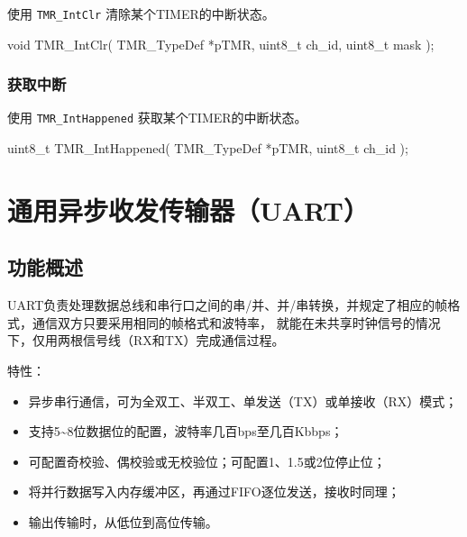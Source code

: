 \documentclass[
  12pt,
]{book}
\newenvironment{Shaded}{\begin{snugshade}}{\end{snugshade}}
\newcommand{\DataTypeTok}[1]{\textcolor[rgb]{0.13,0.29,0.53}{#1}}
\newcommand{\NormalTok}[1]{#1}
\providecommand{\tightlist}{%
  \setlength{\itemsep}{0pt}\setlength{\parskip}{0pt}}
\begin{document}
使用 \texttt{TMR\_IntClr} 清除某个TIMER的中断状态。

\begin{Shaded}
\begin{Highlighting}[]
\DataTypeTok{void}\NormalTok{ TMR_IntClr(}
\NormalTok{  TMR_TypeDef *pTMR, }
  \DataTypeTok{uint8_t}\NormalTok{ ch_id, }
  \DataTypeTok{uint8_t}\NormalTok{ mask}
\NormalTok{  );}
\end{Highlighting}
\end{Shaded}

\hypertarget{ux83b7ux53d6ux4e2dux65ad}{%
\subsection{获取中断}\label{ux83b7ux53d6ux4e2dux65ad}}

使用 \texttt{TMR\_IntHappened} 获取某个TIMER的中断状态。

\begin{Shaded}
\begin{Highlighting}[]
\DataTypeTok{uint8_t}\NormalTok{ TMR_IntHappened(}
\NormalTok{  TMR_TypeDef *pTMR, }
  \DataTypeTok{uint8_t}\NormalTok{ ch_id}
\NormalTok{  );}
\end{Highlighting}
\end{Shaded}

\hypertarget{ch-uart}{%
\chapter{通用异步收发传输器（UART）}\label{ch-uart}}

\hypertarget{ux529fux80fdux6982ux8ff0-6}{%
\section{功能概述}\label{ux529fux80fdux6982ux8ff0-6}}

UART负责处理数据总线和串行口之间的串/并、并/串转换，并规定了相应的帧格式，通信双方只要采用相同的帧格式和波特率，
就能在未共享时钟信号的情况下，仅用两根信号线（RX和TX）完成通信过程。

特性：

\begin{itemize}
\tightlist
\item
  异步串行通信，可为全双工、半双工、单发送（TX）或单接收（RX）模式；
\item
  支持5\textasciitilde8位数据位的配置，波特率几百bps至几百Kbbps；
\item
  可配置奇校验、偶校验或无校验位；可配置1、1.5或2位停止位；
\item
  将并行数据写入内存缓冲区，再通过FIFO逐位发送，接收时同理；
\item
  输出传输时，从低位到高位传输。
\end{itemize}
\end{document}
